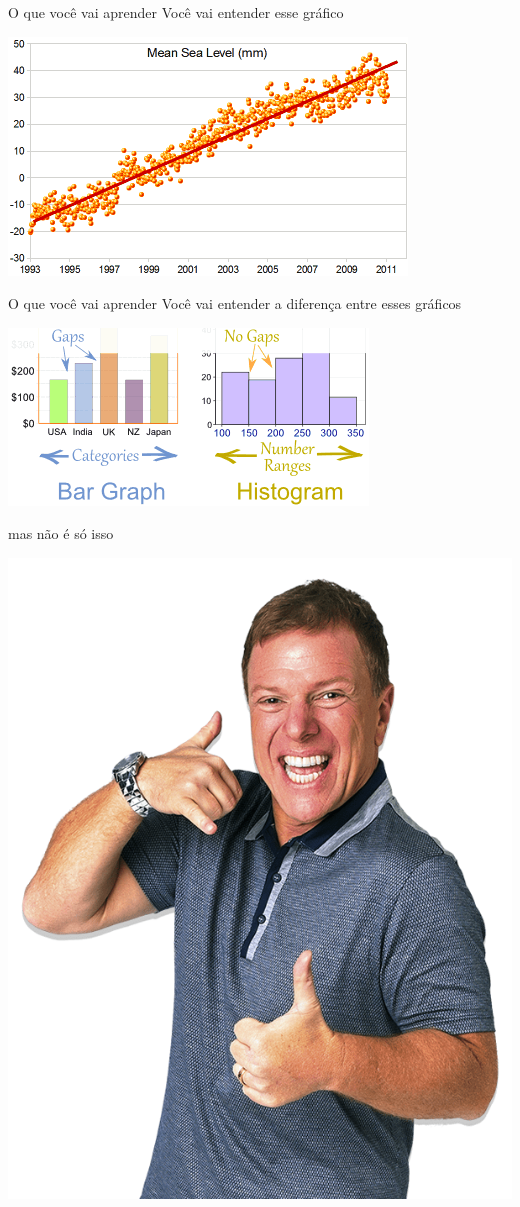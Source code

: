 \documentclass{beamer}
\begin{document}
\begin{frame}{\scriptsize O que você vai aprender}
    Você vai entender esse gráfico

    \bigskip
  \begin{center}
    \includegraphics[width=.7\textwidth]{Cap1/mean-sea-level-line}
  \end{center}
\end{frame}

\begin{frame}{\scriptsize O que você vai aprender}
    Você vai entender a diferença entre esses gráficos

    \bigskip
  \begin{center}
    \includegraphics[width=.7\textwidth]{Cap1/bar-chart-vs-histogram}
  \end{center}
\end{frame}

\begin{frame}{\scriptsize mas não é só isso}
  \begin{center}
    \includegraphics[width=.7\textwidth]{Cap1/bottini}
  \end{center}
\end{frame}
\end{document}

